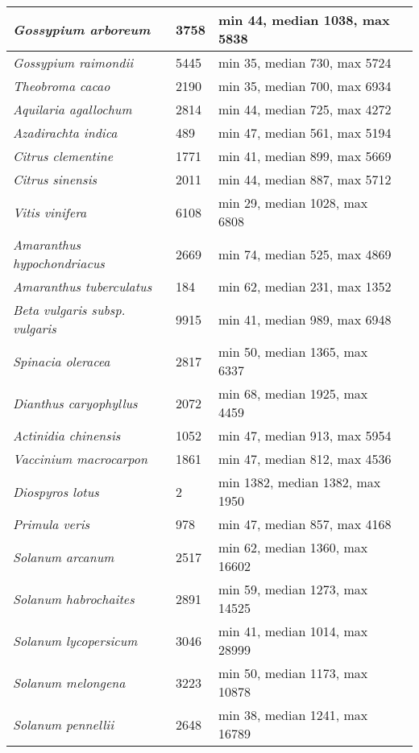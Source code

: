 {\begin{longtable}{| L{4cm} | L{2cm}  | L{5cm} | L{4cm} |}
\textit{Gossypium arboreum} & 3758 & min 44, median 1038, max 5838 & \\ \hline
\textit{Gossypium raimondii} & 5445 & min 35, median 730, max 5724 & \\ \hline
\textit{Theobroma cacao} & 2190 & min 35, median 700, max 6934 & \\ \hline
\textit{Aquilaria agallochum} & 2814 & min 44, median 725, max 4272 & \\ \hline
\textit{Azadirachta indica} & 489 & min 47, median 561, max 5194 & \\ \hline
\textit{Citrus clementine} & 1771 & min 41, median 899, max 5669 & \\ \hline
\textit{Citrus sinensis} & 2011 & min 44, median 887, max 5712 & \\ \hline
\textit{Vitis vinifera} & 6108 & min 29, median 1028, max 6808 & \\ \hline
\textit{Amaranthus hypochondriacus} & 2669 & min 74, median 525, max 4869 & \\ \hline
\textit{Amaranthus tuberculatus} & 184 & min 62, median 231, max 1352 & \\ \hline
\textit{Beta vulgaris subsp. vulgaris} & 9915 & min 41, median 989, max 6948 & \\ \hline
\textit{Spinacia oleracea} & 2817 & min 50, median 1365, max 6337 & \\ \hline
\textit{Dianthus caryophyllus} & 2072 & min 68, median 1925, max 4459 & \\ \hline
\textit{Actinidia chinensis} & 1052 & min 47, median 913, max 5954 & \\ \hline
\textit{Vaccinium macrocarpon} & 1861 & min 47, median 812, max 4536 & \\ \hline
\textit{Diospyros lotus} & 2 & min 1382, median 1382, max 1950 & \\ \hline
\textit{Primula veris} & 978 & min 47, median 857, max 4168 & \\ \hline
\textit{Solanum arcanum} & 2517 & min 62, median 1360, max 16602 & \\ \hline
\textit{Solanum habrochaites} & 2891 & min 59, median 1273, max 14525 & \\ \hline
\textit{Solanum lycopersicum} & 3046 & min 41, median 1014, max 28999 & \\ \hline
\textit{Solanum melongena} & 3223 & min 50, median 1173, max 10878 & \\ \hline
\textit{Solanum pennellii} & 2648 & min 38, median 1241, max 16789 & \\ \hline

\end{longtable}}
